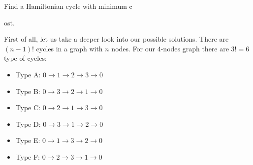Find a Hamiltonian cycle with minimum c\begin{table}[H]
	\centering
	\caption{Graphical representation of penalties between interactions \cite{Sarkar2020}}
	\label{fig:salesman-penalties}
\end{table}ost. 

First of all, let us take a deeper look into our possible solutions. There are $(n-1)!$ cycles in a graph with $n$ nodes. For our $4$-nodes graph there are $3! = 6$ type of cycles:

\begin{itemize}
	\item Type A: $0 \rightarrow 1 \rightarrow 2 \rightarrow 3 \rightarrow 0$
	\item Type B: $0 \rightarrow 3 \rightarrow 2 \rightarrow 1 \rightarrow 0$
	\item Type C: $0 \rightarrow 2 \rightarrow 1 \rightarrow 3 \rightarrow 0$
	\item Type D: $0 \rightarrow 3 \rightarrow 1 \rightarrow 2 \rightarrow 0$
	\item Type E: $0 \rightarrow 1 \rightarrow 3 \rightarrow 2 \rightarrow 0$
	\item Type F: $0 \rightarrow 2 \rightarrow 3 \rightarrow 1 \rightarrow 0$
\end{itemize}

